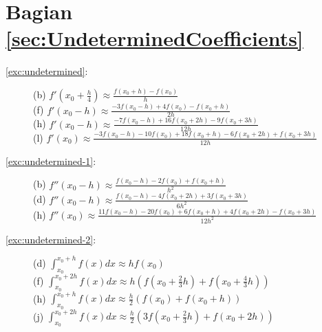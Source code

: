 \section*{Bagian \ref{sec:UndeterminedCoefficients}}
\begin{description}
\item [{\ref{exc:undetermined}:}] (b) ${\displaystyle f'\left(x_{0}+\frac{h}{4}\right)\approx\frac{f(x_{0}+h)-f(x_{0})}{h}}$\\
(f) ${\displaystyle f'\left(x_{0}-h\right)\approx\frac{-3f(x_{0}-h)+4f(x_{0})-f(x_{0}+h)}{2h}}$\\
(h) ${\displaystyle f'\left(x_{0}-h\right)\approx\frac{-7f(x_{0}-h)+16f(x_{0}+2h)-9f(x_{0}+3h)}{12h}}$\\
(l) ${\displaystyle f'\left(x_{0}\right)\approx\frac{-3f(x_{0}-h)-10f(x_{0})+18f(x_{0}+h)-6f(x_{0}+2h)+f(x_{0}+3h)}{12h}}$
\item [{\ref{exc:undetermined-1}:}] (b) ${\displaystyle f''\left(x_{0}-h\right)\approx\frac{f(x_{0}-h)-2f(x_{0})+f(x_{0}+h)}{h^{2}}}$\\
(d) ${\displaystyle f''\left(x_{0}-h\right)\approx\frac{f(x_{0}-h)-4f(x_{0}+2h)+3f(x_{0}+3h)}{6h^{2}}}$\\
(h) ${\displaystyle f''\left(x_{0}\right)\approx\frac{11f(x_{0}-h)-20f(x_{0})+6f(x_{0}+h)+4f(x_{0}+2h)-f(x_{0}+3h)}{12h^{2}}}$
\item [{\ref{exc:undetermined-2}:}] (d) ${\displaystyle \int_{x_{0}}^{x_{0}+h}f(x)dx\approx hf(x_{0})}$\\
(f) ${\displaystyle \int_{x_{0}}^{x_{0}+2h}f(x)dx\approx h\left(f\left(x_{0}+\frac{2}{3}h\right)+f\left(x_{0}+\frac{4}{3}h\right)\right)}$\\
(h) ${\displaystyle \int_{x_{0}}^{x_{0}+h}f(x)dx\approx\frac{h}{2}\left(f(x_{0})+f(x_{0}+h)\right)}$\\
(j) ${\displaystyle \int_{x_{0}}^{x_{0}+2h}f(x)dx\approx\frac{h}{2}\left(3f\left(x_{0}+\frac{2}{3}h\right)+f(x_{0}+2h)\right)}$
\end{description}

